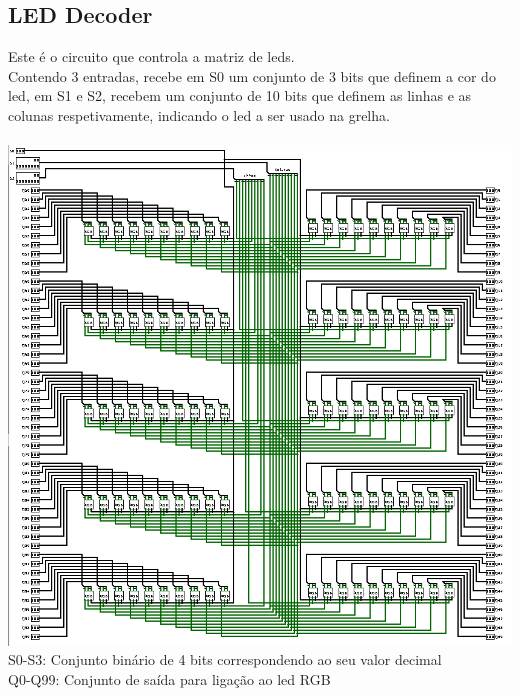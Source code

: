 \documentclass[12pt,a4paper,portrait]{article}
\begin{document}
		\subsection{LED Decoder}
			Este é o circuito que controla a matriz de leds.\\
			Contendo 3 entradas, recebe em S0 um conjunto de 3 bits que definem a cor do led, em S1 e S2, recebem um conjunto de 10 bits que definem as linhas e as colunas respetivamente, indicando o led a ser usado na grelha.\\\\		
			\includegraphics[width=1.0\textwidth]{imagens/leddec}\\
			S0-S3: Conjunto binário de 4 bits correspondendo ao seu valor decimal\\
			Q0-Q99: Conjunto  de saída para ligação ao led RGB\\
			\newpage
\end{document}
